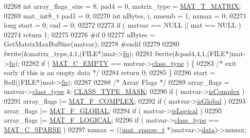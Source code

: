\begin{DoxyCode}
{{{{{{{{{{{{{{{{02268     \textcolor{keywordtype}{int} array\_flags\_size = 8, pad4 = 0, matrix\_type = \hyperlink{group___m_a_t_ggacf7b3b879282b7ab3a51190e49bf3453a32985fee89a4df8db4b3f5d3a48823d3}{MAT\_T\_MATRIX};
02269     mat\_int8\_t pad1 = 0;
02270     \textcolor{keywordtype}{int} nBytes, i, nmemb = 1, nzmax = 0;
02271     \textcolor{keywordtype}{long} start = 0, end = 0;
02272 
02273     \textcolor{keywordflow}{if} ( matvar == NULL || mat == NULL )
02274         \textcolor{keywordflow}{return} 1;
02275 
02276 \textcolor{preprocessor}{#if 0}
02277     nBytes = GetMatrixMaxBufSize(matvar);
02278 \textcolor{preprocessor}{#endif}
02279 
02280     fwrite(&matrix\_type,4,1,(FILE*)mat->\hyperlink{struct__mat__t_a85f562e407ca9ad4d2a6e14f839432b7}{fp});
02281     fwrite(&pad4,4,1,(FILE*)mat->\hyperlink{struct__mat__t_a85f562e407ca9ad4d2a6e14f839432b7}{fp});
02282     \textcolor{keywordflow}{if} ( \hyperlink{group___m_a_t_ggad4d60ae7b709fc81bfd744fb4c857c40a5c76eef0ca0373d25abe49053be6fa9a}{MAT\_C\_EMPTY} == matvar->\hyperlink{group___m_a_t_aff13035bf3265dd7d9425e5d40c839d4}{class\_type} ) \{
02283         \textcolor{comment}{/* exit early if this is an empty data */}
02284         \textcolor{keywordflow}{return} 0;
02285     \}
02286     start = ftell((FILE*)mat->\hyperlink{struct__mat__t_a85f562e407ca9ad4d2a6e14f839432b7}{fp});
02287 
02288     \textcolor{comment}{/* Array Flags */}
02289     array\_flags = matvar->\hyperlink{group___m_a_t_aff13035bf3265dd7d9425e5d40c839d4}{class\_type} & \hyperlink{mat5_8c_a24b94e17e9c34b9c795798099c710751}{CLASS\_TYPE\_MASK};
02290     \textcolor{keywordflow}{if} ( matvar->\hyperlink{group___m_a_t_aeb03b3a69f108dc05470b00443a43739}{isComplex} )
02291         array\_flags |= \hyperlink{group___m_a_t_ggab9d6ef9e3ddca78a317b173f01d53fbbacd7b091a11184aad7fc6078c04470780}{MAT\_F\_COMPLEX};
02292     \textcolor{keywordflow}{if} ( matvar->\hyperlink{group___m_a_t_af26c71c4c0ddb14931d15910dddac1bc}{isGlobal} )
02293         array\_flags |= \hyperlink{group___m_a_t_ggab9d6ef9e3ddca78a317b173f01d53fbba49084e0c796aa7963e53f7539525d40d}{MAT\_F\_GLOBAL};
02294     \textcolor{keywordflow}{if} ( matvar->\hyperlink{group___m_a_t_a866c1539e68073a837833d74cd4a65be}{isLogical} )
02295         array\_flags |= \hyperlink{group___m_a_t_ggab9d6ef9e3ddca78a317b173f01d53fbba57eb5c6e200bcbc0f1b7982f29a169c2}{MAT\_F\_LOGICAL};
02296     \textcolor{keywordflow}{if} ( matvar->\hyperlink{group___m_a_t_aff13035bf3265dd7d9425e5d40c839d4}{class\_type} == \hyperlink{group___m_a_t_ggad4d60ae7b709fc81bfd744fb4c857c40a0d5655b7e6178a2242cb3bb56ff4c8d2}{MAT\_C\_SPARSE} )
02297         nzmax = ((\hyperlink{group___m_a_t_structmat__sparse__t}{mat\_sparse\_t} *)matvar->\hyperlink{group___m_a_t_a5672978efa230bbdecdf38ede781f7fa}{data})->nzmax;
}}}}}}}}}}}}}}}}
\end{DoxyCode}
